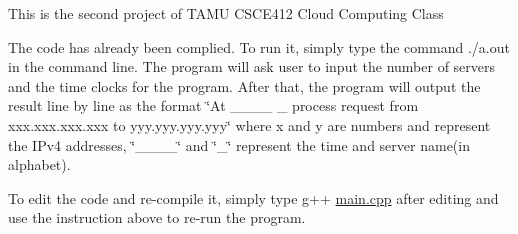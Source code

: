 This is the second project of TAMU CSCE412 Cloud Computing Class

The code has already been complied. To run it, simply type the command {\ttfamily ./a.out} in the command line. The program will ask user to input the number of servers and the time clocks for the program. After that, the program will output the result line by line as the format \char`\"{}\+At \+\_\+\+\_\+\+\_\+\+\_\+ \+\_\+ process request from xxx.\+xxx.\+xxx.\+xxx to yyy.\+yyy.\+yyy.\+yyy\char`\"{} where x and y are numbers and represent the IPv4 addresses, \char`\"{}\+\_\+\+\_\+\+\_\+\+\_\+\char`\"{} and \char`\"{}\+\_\+\char`\"{} represent the time and server name(in alphabet).

To edit the code and re-\/compile it, simply type {\ttfamily g++ \mbox{\hyperlink{main_8cpp}{main.\+cpp}}} after editing and use the instruction above to re-\/run the program. 